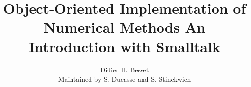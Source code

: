 \documentclass[twoside]{book}
\begin{document}
\title{\LARGE \textbf{Object-Oriented Implementation of \linebreak Numerical Methods\linebreak
 An Introduction with Smalltalk}}
\author{Didier H. Besset \\ Maintained by S. Ducasse and S. Stinckwich}
\maketitle {}


\makeatletter
\def\url@leostyle{%
  \@ifundefined{selectfont}{\def\UrlFont{\sf}}{\def\UrlFont{\sffamily}}}
\makeatother

~ %
\vfill
\end{document}
